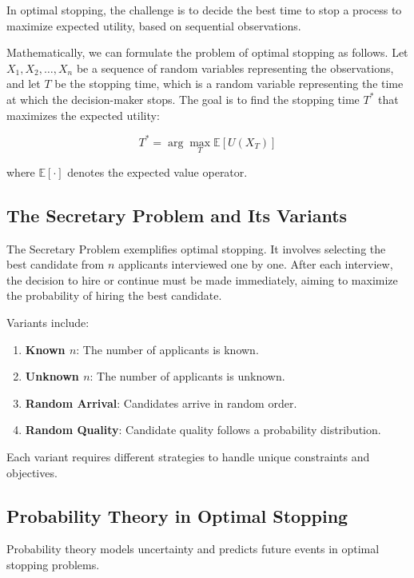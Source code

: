 \documentclass[12pt]{book} %
\begin{document}
In optimal stopping, the challenge is to decide the best time to stop a process to maximize expected utility, based on sequential observations.

Mathematically, we can formulate the problem of optimal stopping as follows. Let $X_1, X_2, \ldots, X_n$ be a sequence of random variables representing the observations, and let $T$ be the stopping time, which is a random variable representing the time at which the decision-maker stops. The goal is to find the stopping time $T^*$ that maximizes the expected utility:

\begin{equation*}
    T^* = \arg\max_{T} \mathbb{E}[U(X_T)]
\end{equation*}

where $\mathbb{E}[\cdot]$ denotes the expected value operator.


\subsection{The Secretary Problem and Its Variants}

The Secretary Problem exemplifies optimal stopping. It involves selecting the best candidate from $n$ applicants interviewed one by one. After each interview, the decision to hire or continue must be made immediately, aiming to maximize the probability of hiring the best candidate.

Variants include:

\begin{enumerate}
    \item \textbf{Known $n$}: The number of applicants is known.
    \item \textbf{Unknown $n$}: The number of applicants is unknown.
    \item \textbf{Random Arrival}: Candidates arrive in random order.
    \item \textbf{Random Quality}: Candidate quality follows a probability distribution.
\end{enumerate}

Each variant requires different strategies to handle unique constraints and objectives.


\subsection{Probability Theory in Optimal Stopping}

Probability theory models uncertainty and predicts future events in optimal stopping problems.
\end{document}
